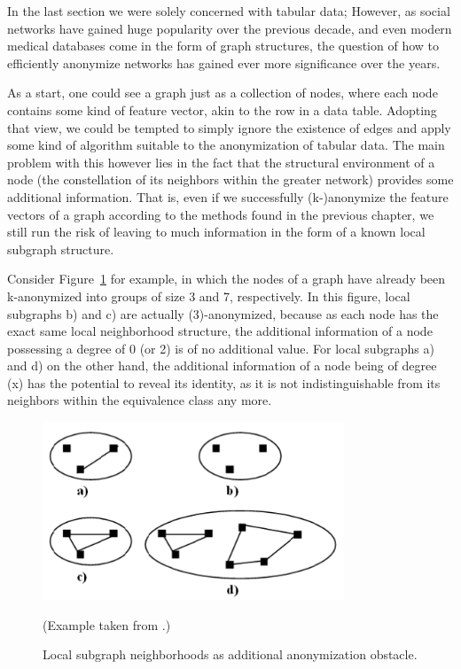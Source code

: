 \documentclass{llncs}
\begin{document}
In the last section we were solely concerned with tabular data; However, as social networks have gained huge popularity over the previous decade, and even modern medical databases come in the form of graph structures, the question of how to efficiently anonymize networks has gained ever more significance over the years.

As a start, one could see a graph just as a collection of nodes, where each node contains some kind of feature vector, akin to the row in a data table. Adopting that view, we could be tempted to simply ignore the existence of edges and apply some kind of algorithm suitable to the anonymization of tabular data. The main problem with this however lies in the fact that the structural environment of a node (the constellation of its neighbors within the greater network) provides some additional information. That is, even if we successfully (k-)anonymize the feature vectors of a graph according to the methods found in the previous chapter, we still run the risk of leaving to much information in the form of a known local subgraph structure.

Consider Figure~\ref{fig:anon_sn_problem} for example, in which the nodes of a graph have already been k-anonymized into groups of size 3 and 7, respectively. In this figure, local subgraphs b) and c) are actually (3)-anonymized, because as each node has the exact same local neighborhood structure, the additional information of a node possessing a degree of 0 (or 2) is of no additional value. For local subgraphs a) and d) on the other hand, the additional information of a node being of degree (x) has the potential to reveal its identity, as it is not indistinguishable from its neighbors within the equivalence class any more.

\begin{figure}[!t]
	\begin{center}
		\includegraphics[width=0.8\textwidth]{figures/anonym/sn_problem}
		\caption{Local subgraph neighborhoods as additional anonymization obstacle.}
		\label{fig:anon_sn_problem}
	\end{center}
	\small
	(Example taken from \cite{campan2009data}.)
\end{figure}
\end{document}
